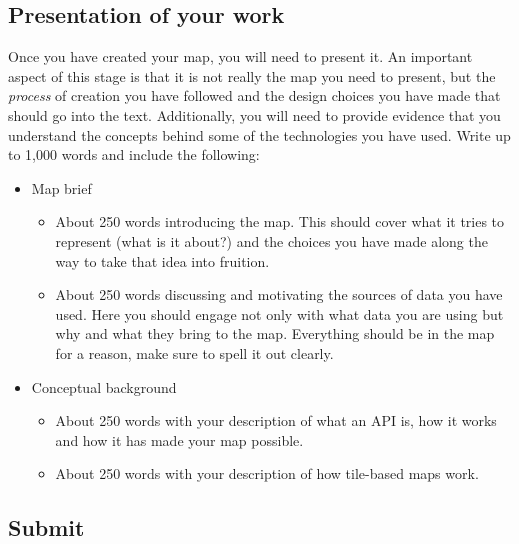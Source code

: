 \documentclass[
  letterpaper,
  DIV=11,
  numbers=noendperiod]{scrreprt}
\begin{document}
\hypertarget{presentation-of-your-work}{%
\subsection*{Presentation of your
work}\label{presentation-of-your-work}}

Once you have created your map, you will need to present it. An
important aspect of this stage is that it is not really the map you need
to present, but the \emph{process} of creation you have followed and the
design choices you have made that should go into the text. Additionally,
you will need to provide evidence that you understand the concepts
behind some of the technologies you have used. Write up to 1,000 words
and include the following:

\begin{itemize}
\item
  Map brief

  \begin{itemize}
  \item
    About 250 words introducing the map. This should cover what it tries
    to represent (what is it about?) and the choices you have made along
    the way to take that idea into fruition.
  \item
    About 250 words discussing and motivating the sources of data you
    have used. Here you should engage not only with what data you are
    using but why and what they bring to the map. Everything should be
    in the map for a reason, make sure to spell it out clearly.
  \end{itemize}
\item
  Conceptual background

  \begin{itemize}
  \item
    About 250 words with your description of what an API is, how it
    works and how it has made your map possible.
  \item
    About 250 words with your description of how tile-based maps work.
  \end{itemize}
\end{itemize}

\hypertarget{submit}{%
\subsection*{Submit}\label{submit}}
\end{document}
